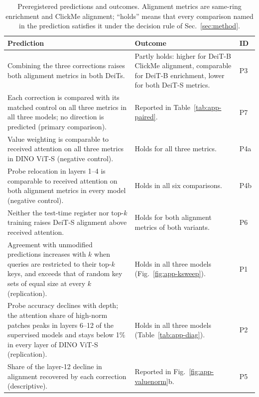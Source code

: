 \begin{table}[!htbp]
\caption{Preregistered predictions and outcomes. Alignment metrics are same-ring enrichment and ClickMe alignment; ``holds'' means that every comparison named in the prediction satisfies it under the decision rule of Sec.~\ref{sec:method}.}
\label{tab:app-registered}
\centering\footnotesize
\setlength{\tabcolsep}{4pt}
\begin{tabular}{@{}>{\raggedright\arraybackslash}p{3.3in}>{\raggedright\arraybackslash}p{1.75in}l@{}}
\toprule
Prediction & Outcome & ID\\
\midrule
Combining the three corrections raises both alignment metrics in both DeiTs. & Partly holds: higher for DeiT-B ClickMe alignment, comparable for DeiT-B enrichment, lower for both DeiT-S metrics. & P3\\
Each correction is compared with its matched control on all three metrics in all three models; no direction is predicted (primary comparison). & Reported in Table~\ref{tab:app-paired}. & P7\\
Value weighting is comparable to received attention on all three metrics in DINO ViT-S (negative control). & Holds for all three metrics. & P4a\\
Probe relocation in layers 1--4 is comparable to received attention on both alignment metrics in every model (negative control). & Holds in all six comparisons. & P4b\\
Neither the test-time register nor top-$k$ training raises DeiT-S alignment above received attention. & Holds for both alignment metrics of both variants. & P6\\
Agreement with unmodified predictions increases with $k$ when queries are restricted to their top-$k$ keys, and exceeds that of random key sets of equal size at every $k$ (replication). & Holds in all three models (Fig.~\ref{fig:app-ksweep}). & P1\\
Probe accuracy declines with depth; the attention share of high-norm patches peaks in layers 6--12 of the supervised models and stays below 1\% in every layer of DINO ViT-S (replication). & Holds in all three models (Table~\ref{tab:app-diag}). & P2\\
Share of the layer-12 decline in alignment recovered by each correction (descriptive). & Reported in Fig.~\ref{fig:app-valuenorm}b. & P5\\
\bottomrule
\end{tabular}
\end{table}

